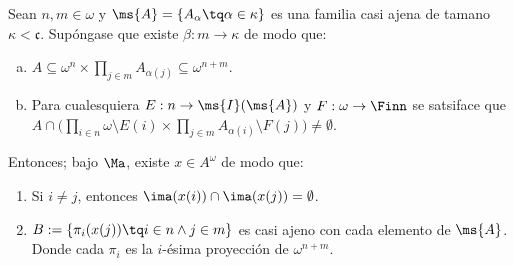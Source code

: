 \begin{lema}
	Sean $n,m \in \omega$ y $\ms{A}=\{A_\alpha \tq \alpha \in \kappa\}$ es una familia casi ajena de tamano $\kappa<\mathfrak{c}$. Supóngase que existe $\beta : m \to \kappa$  de modo que:
	\begin{enumerate}[a)]
		\item $A \subseteq \omega^n \times \prod_{j \in m} {A_{\alpha(j)}} \subseteq \omega^{n+m}$.
		\item Para cualesquiera $E: n \to \ms{I}(\ms{A})$ y $F: \omega \to \Finn$ se satsiface que $A \cap \Big( \prod_{i \in n} \omega \setminus E(i) \times \prod_{j \in m} A_{\alpha(i)} \setminus F(j) \Big)\neq \emptyset$.
	\end{enumerate}
	Entonces; bajo $\Ma$, existe $x \in A^\omega$ de modo que:
	\begin{enumerate}
		\item Si $i \neq j$, entonces $\ima(x(i)) \cap \ima(x(j)) = \emptyset$.
		\item $B:=\{ \pi_i (x(j)) \tq i \in n \land j \in m \}$ es casi ajeno con cada elemento de $\ms{A}$. Donde cada $\pi_i$ es la $i$-ésima proyección de $\omega^{n+m}$.
	\end{enumerate}
\end{lema}